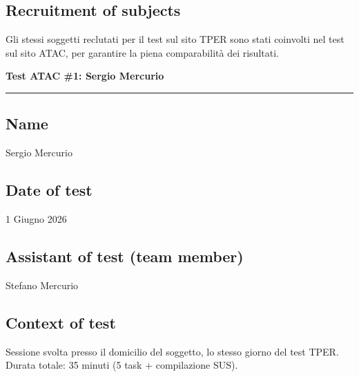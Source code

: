 \documentclass[11pt,a4paper]{article}
\begin{document}
\vspace{0.2cm}

\subsection*{Recruitment of subjects}
\begin{tcolorbox}[colback=backgroundColor,colframe=borderColor,arc=2mm]
Gli stessi soggetti reclutati per il test sul sito TPER
sono stati coinvolti nel test sul sito ATAC, per garantire
la piena comparabilità dei risultati.
\end{tcolorbox}


\newpage
\begin{center}
  {\color{secondaryColor}\large\bfseries
  Test ATAC \#1: Sergio Mercurio}\\
  \vspace{0.1cm}
  \color{borderColor}\hrule
\end{center}

\vspace{0.5cm}

\subsection*{Name}
\begin{tcolorbox}[colback=backgroundColor,colframe=borderColor,arc=2mm]
Sergio Mercurio
\end{tcolorbox}

\subsection*{Date of test}
\begin{tcolorbox}[colback=backgroundColor,colframe=borderColor,arc=2mm]
1 Giugno 2026
\end{tcolorbox}

\subsection*{Assistant of test (team member)}
\begin{tcolorbox}[colback=backgroundColor,colframe=borderColor,arc=2mm]
Stefano Mercurio
\end{tcolorbox}

\subsection*{Context of test}
\begin{tcolorbox}[colback=backgroundColor,colframe=borderColor,arc=2mm]
Sessione svolta presso il domicilio del soggetto, lo stesso giorno del
test TPER. Durata totale: 35 minuti (5 task +
compilazione SUS).
\end{tcolorbox}
\end{document}
